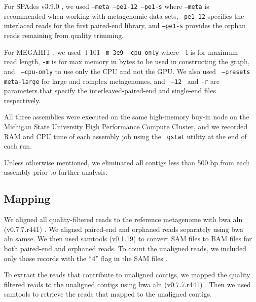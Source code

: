 \documentclass[10pt,a4paper,twocolumn]{article}
\begin{document}
For SPAdes v3.9.0 \cite{spades}, we used { \tt {--meta --pe1-12
    --pe1-s}} where {\tt{--meta}} is recommended when working with
metagenomic data sets, {\tt{--pe1-12}} specifies the interlaced reads
for the first paired-end library, and {\tt{--pe1-s}} provides the
orphan reads remaining from quality trimming.

For MEGAHIT \cite{megahit}, we used -l 101 {\tt{-m 3e9
    --cpu-only}} where {\tt -l} is for maximum read length, {\tt -m} is
for max memory in bytes to be used in constructing the graph, and {\tt
  {--cpu-only}} to use only the CPU and not the GPU. We also used {\tt
  {--presets meta-large}} for large and complex metagenomes, and {\tt
  {--12} } and {\tt{-r}} are parameters that specify the
interleaved-paired-end and single-end files respectively.

All three assemblies were executed on the same high-memory buy-in node
on the Michigan State University High Performance Compute Cluster, and
we recorded RAM and CPU time of each assembly job using the {\tt
  qstat} utility at the end of each run.

Unless otherwise mentioned, we eliminated all contigs less than 500 bp
from each assembly prior to further analysis.

\subsection*{Mapping}

We aligned all quality-filtered reads to the reference metagenome with
bwa aln (v0.7.7.r441) \cite{bwa}. We aligned paired-end and orphaned
reads separately using bwa aln samse. We then used samtools (v0.1.19)
\cite{sam-stools} to convert SAM files to BAM files for both
paired-end and orphaned reads. To count the unaligned reads, we
included only those records with the ``4'' flag in the SAM files
\cite{sam-stools}.
 

To extract the reads that contribute to unaligned contigs, we mapped
the quality filtered reads to the unaligned contigs using bwa aln
(v0.7.7.r441) \cite{bwa}.  Then we used samtools to retrieve the reads
that mapped to the unaligned contigs.



\end{document}
